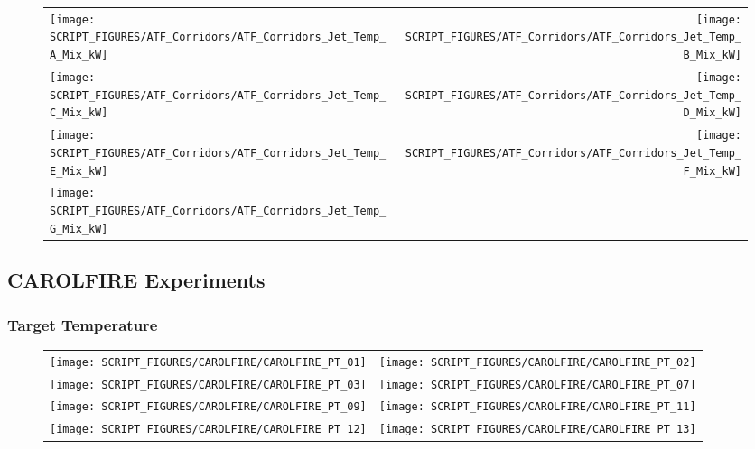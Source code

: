 \begin{figure}[!ht]
\begin{tabular*}{\textwidth}{l@{\extracolsep{\fill}}r}
\texttt{[image: SCRIPT\_FIGURES/ATF\_Corridors/ATF\_Corridors\_Jet\_Temp\_A\_Mix\_kW]} &
\texttt{[image: SCRIPT\_FIGURES/ATF\_Corridors/ATF\_Corridors\_Jet\_Temp\_B\_Mix\_kW]} \\
\texttt{[image: SCRIPT\_FIGURES/ATF\_Corridors/ATF\_Corridors\_Jet\_Temp\_C\_Mix\_kW]} &
\texttt{[image: SCRIPT\_FIGURES/ATF\_Corridors/ATF\_Corridors\_Jet\_Temp\_D\_Mix\_kW]} \\
\texttt{[image: SCRIPT\_FIGURES/ATF\_Corridors/ATF\_Corridors\_Jet\_Temp\_E\_Mix\_kW]} &
\texttt{[image: SCRIPT\_FIGURES/ATF\_Corridors/ATF\_Corridors\_Jet\_Temp\_F\_Mix\_kW]} \\
\texttt{[image: SCRIPT\_FIGURES/ATF\_Corridors/ATF\_Corridors\_Jet\_Temp\_G\_Mix\_kW]} &
\end{tabular*}
\label{ATF_Corridors_Jet_Temp_Mix_kW}
\end{figure}

\clearpage

\subsection{CAROLFIRE Experiments}

\subsubsection{Target Temperature}

\begin{figure}[!ht]
\begin{tabular*}{\textwidth}{l@{\extracolsep{\fill}}r}
\texttt{[image: SCRIPT\_FIGURES/CAROLFIRE/CAROLFIRE\_PT\_01]} &
\texttt{[image: SCRIPT\_FIGURES/CAROLFIRE/CAROLFIRE\_PT\_02]} \\
\texttt{[image: SCRIPT\_FIGURES/CAROLFIRE/CAROLFIRE\_PT\_03]} &
\texttt{[image: SCRIPT\_FIGURES/CAROLFIRE/CAROLFIRE\_PT\_07]} \\
\texttt{[image: SCRIPT\_FIGURES/CAROLFIRE/CAROLFIRE\_PT\_09]} &
\texttt{[image: SCRIPT\_FIGURES/CAROLFIRE/CAROLFIRE\_PT\_11]} \\
\texttt{[image: SCRIPT\_FIGURES/CAROLFIRE/CAROLFIRE\_PT\_12]} &
\texttt{[image: SCRIPT\_FIGURES/CAROLFIRE/CAROLFIRE\_PT\_13]}
\end{tabular*}
\label{CAROLFIRE_Thermoset_1}
\end{figure}

